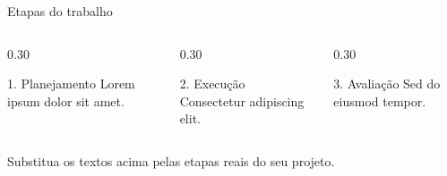 \begin{frame}{Etapas do trabalho}
  \begin{columns}[c,onlytextwidth]
    \begin{column}{0.30\textwidth}
      \centering
      \begin{block}{1. Planejamento}
        \centering Lorem ipsum dolor sit amet.
      \end{block}
    \end{column}
    \begin{column}{0.30\textwidth}
      \centering
      \begin{block}{2. Execução}
        \centering Consectetur adipiscing elit.
      \end{block}
    \end{column}
    \begin{column}{0.30\textwidth}
      \centering
      \begin{block}{3. Avaliação}
        \centering Sed do eiusmod tempor.
      \end{block}
    \end{column}
  \end{columns}

  \vspace{0.5cm}
  \centering
  \alert{Substitua os textos acima pelas etapas reais do seu projeto.}
\end{frame}